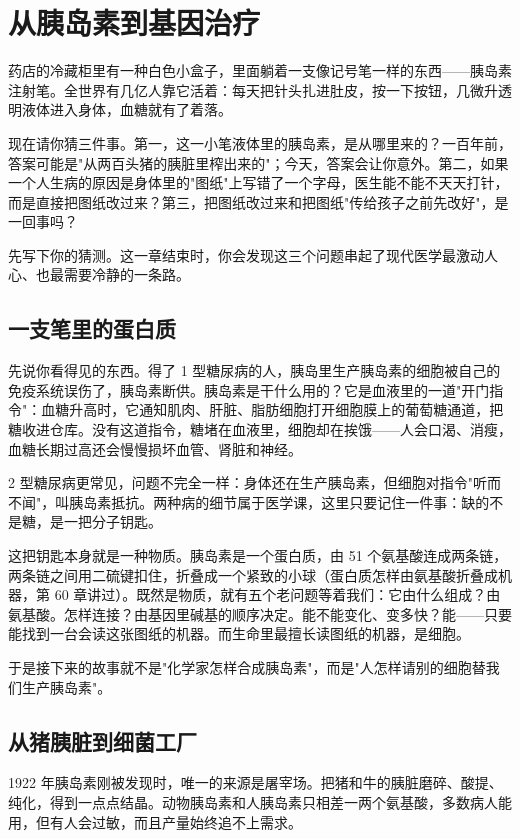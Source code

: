 \chapter{从胰岛素到基因治疗}

\begin{kaichang}
药店的冷藏柜里有一种白色小盒子，里面躺着一支像记号笔一样的东西——胰岛素注射笔。全世界有几亿人靠它活着：每天把针头扎进肚皮，按一下按钮，几微升透明液体进入身体，血糖就有了着落。

现在请你猜三件事。第一，这一小笔液体里的胰岛素，是从哪里来的？一百年前，答案可能是"从两百头猪的胰脏里榨出来的"；今天，答案会让你意外。第二，如果一个人生病的原因是身体里的"图纸"上写错了一个字母，医生能不能不天天打针，而是直接把图纸改过来？第三，把图纸改过来和把图纸"传给孩子之前先改好"，是一回事吗？

先写下你的猜测。这一章结束时，你会发现这三个问题串起了现代医学最激动人心、也最需要冷静的一条路。
\end{kaichang}

\section{一支笔里的蛋白质}

先说你看得见的东西。得了 1 型糖尿病的人，胰岛里生产胰岛素的细胞被自己的免疫系统误伤了，胰岛素断供。胰岛素是干什么用的？它是血液里的一道"开门指令"：血糖升高时，它通知肌肉、肝脏、脂肪细胞打开细胞膜上的葡萄糖通道，把糖收进仓库。没有这道指令，糖堵在血液里，细胞却在挨饿——人会口渴、消瘦，血糖长期过高还会慢慢损坏血管、肾脏和神经。

2 型糖尿病更常见，问题不完全一样：身体还在生产胰岛素，但细胞对指令"听而不闻"，叫胰岛素抵抗。两种病的细节属于医学课，这里只要记住一件事：缺的不是糖，是一把分子钥匙。

这把钥匙本身就是一种物质。胰岛素是一个蛋白质，由 51 个氨基酸连成两条链，两条链之间用二硫键扣住，折叠成一个紧致的小球（蛋白质怎样由氨基酸折叠成机器，第 60 章讲过）。既然是物质，就有五个老问题等着我们：它由什么组成？由氨基酸。怎样连接？由基因里碱基的顺序决定。能不能变化、变多快？能——只要能找到一台会读这张图纸的机器。而生命里最擅长读图纸的机器，是细胞。

于是接下来的故事就不是"化学家怎样合成胰岛素"，而是"人怎样请别的细胞替我们生产胰岛素"。

\section{从猪胰脏到细菌工厂}

1922 年胰岛素刚被发现时，唯一的来源是屠宰场。把猪和牛的胰脏磨碎、酸提、纯化，得到一点点结晶。动物胰岛素和人胰岛素只相差一两个氨基酸，多数病人能用，但有人会过敏，而且产量始终追不上需求。

